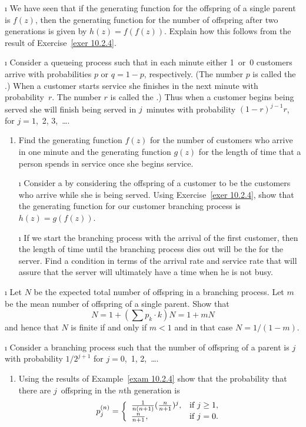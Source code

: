 \begin{LJSItem}
\i\label{exer 10.2.5} We have seen that if the generating function for the offspring of a
single parent is $f(z)$, then the generating function for the number of
offspring after two generations is given by $h(z) = f(f(z))$.  Explain how this
follows from the result of Exercise~\ref{exer 10.2.4}.

\i\label{exer 10.2.6} Consider a queueing process such that in each minute either 1~or~0 customers arrive with probabilities $p$ or 
$q = 1 - p$, respectively.  (The number $p$ is called the .)  
When a customer starts service she finishes in the next minute
with probability~$r$.  The number $r$ is called the .)  
Thus when a customer begins being served she will finish
being served in $j$~minutes with probability $(1 - r)^{j -1}r$, for $j = 1$,~2,
3,~\ldots.
\begin{enumerate}
\item Find the generating function $f(z)$ for the number of customers who
arrive in one minute and the generating function $g(z)$ for the length of time
that a person spends in service once she begins service.

\i\label{exer 10.2.7} Consider a  by considering the offspring of a customer
to be the customers who arrive while she is being served.  Using Exercise~\ref{exer 10.2.4},
show that the generating function for our customer branching process is $h(z) = g(f(z))$.

\i\label{exer 10.2.8} If we start the branching process with the arrival of the first
customer, then the length of time until the branching process dies out will be
the  for the server.  Find a condition in terms of the
arrival rate and service rate that will assure that the server will
ultimately have a time when he is not busy.
\end{enumerate}

\i\label{exer 10.2.9} Let $N$ be the expected total number of offspring in a branching
process.  Let $m$ be the mean number of offspring of a single parent.  Show that
$$
N = 1 + \left(\sum p_k \cdot k\right) N = 1 + mN
$$
and hence that $N$ is finite if and only if $m < 1$ and in that case $N = 1/(1
- m)$.

\i\label{exer 10.2.10} Consider a branching process such that the number of offspring of a
parent is $j$ with probability $1/2^{j + 1}$ for $j = 0$,~1, 2,~\ldots.
\begin{enumerate}
\item Using the results of Example~\ref{exam 10.2.4} show that the probability that
there are $j$~offspring in the $n$th generation is
$$
p_j^{(n)} = \left \{ \begin{array}{ll}
                \frac{1}{n(n + 1)} (\frac {n}{n + 1})^j, & \mbox{if $ j \geq 1$}, \\
                                      \frac {n}{n + 1},  & \mbox{if $ j = 0$}.\end{array}\right.
$$


\end{enumerate}
\end{LJSItem}
